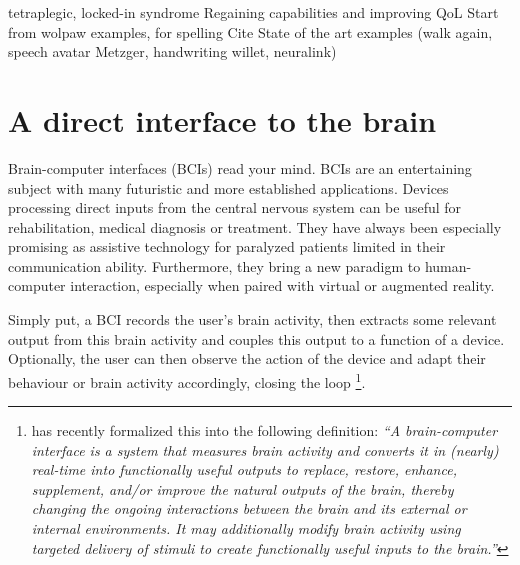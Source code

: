 

tetraplegic, locked-in syndrome
Regaining capabilities and improving QoL
Start from wolpaw examples, for spelling
Cite State of the art examples (walk again, speech avatar Metzger, handwriting
willet, neuralink)

\section{A direct interface to the brain}

Brain-computer interfaces (BCIs) read your mind.
BCIs are an entertaining subject with many futuristic and more established
applications.
Devices processing direct inputs from the central nervous system can be
useful for rehabilitation, medical diagnosis or treatment.
They have always been especially promising as assistive technology for
paralyzed patients limited in their communication ability. 
Furthermore, they bring a new paradigm to human-computer interaction,
especially when paired with virtual or augmented reality.

Simply put, a BCI records the user's brain activity, then extracts some
relevant output from this brain activity and couples this output to a function
of a device.
Optionally, the user can then observe the action of the device and adapt their
behaviour or brain activity accordingly, closing the loop
\footnote{
  \textcite{BCISociety2024} has recently formalized this into the
  following definition:
  \it``A brain-computer interface is a system that measures brain activity and
  converts it in (nearly) real-time into functionally useful outputs to replace,
  restore, enhance, supplement, and/or improve the natural outputs of the brain,
  thereby changing the ongoing interactions between the brain and its external or
  internal environments. It may additionally modify brain activity using targeted
  delivery of stimuli to create functionally useful inputs to the
  brain.''
}.


